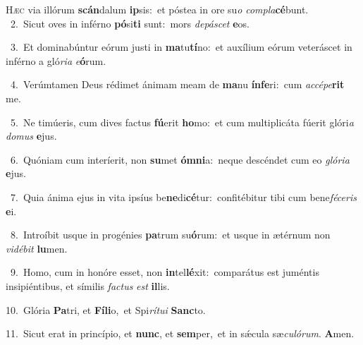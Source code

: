 \lettrine{\initial\textcolor{\initialcolor}{H}}{æc} via illórum \textbf{scán}\-dalum \textbf{ip}\-sis:~\star et póstea in ore su\textit{o} \textit{com}\-\textit{pla}\textbf{cé}bunt.\\
{\numbfont\textcolor{\numbcolor}{~2.}}~Sicut oves in inférno \textbf{pó}\-si\textbf{ti} sunt:~\star mors \textit{de}\-\textit{pá}\textit{scet} \textbf{e}\-os.\par
{\numbfont\textcolor{\numbcolor}{~3.}}~Et dominabúntur eórum justi in \textbf{ma}\-tu\-\textbf{tí}\-no:~\star et auxílium eórum veteráscet in inférno a gló\-\textit{ri}\-\textit{a} \textit{e}\-\textbf{ó}rum.\par
{\numbfont\textcolor{\numbcolor}{~4.}}~Verúmtamen Deus rédimet ánimam meam de \textbf{ma}\-nu \textbf{ín}\-\textbf{fe}ri:~\star cum \textit{ac}\-\textit{cé}\textit{pe}\textbf{rit} me.\par
{\numbfont\textcolor{\numbcolor}{~5.}}~Ne timúeris, cum dives factus \textbf{fú}\-erit \textbf{ho}\-mo:~\star et cum multiplicáta fúerit glóri\textit{a} \textit{do}\-\textit{mus} \textbf{e}\-jus.\par
{\numbfont\textcolor{\numbcolor}{~6.}}~Quóniam cum interíerit, non \textbf{su}\-met \textbf{óm}\-\textbf{ni}a:~\star neque descéndet cum eo \textit{gló}\-\textit{ri}\textit{a} \textbf{e}\-jus.\par
{\numbfont\textcolor{\numbcolor}{~7.}}~Quia ánima ejus in vita ipsíus be\-\textbf{ne}\-di\-\textbf{cé}\-tur:~\star confitébitur tibi cum bene\-\textit{fé}\-\textit{ce}\textit{ris} \textbf{e}\-i.\par
{\numbfont\textcolor{\numbcolor}{~8.}}~Introíbit usque in progénies \textbf{pa}\-trum su\-\textbf{ó}\-rum:~\star et usque in ætérnum non \textit{vi}\-\textit{dé}\textit{bit} \textbf{lu}\-men.\par
{\numbfont\textcolor{\numbcolor}{~9.}}~Homo, cum in honóre esset, non \textbf{in}\-tel\-\textbf{lé}\-xit:~\star comparátus est juméntis insipiéntibus, et símilis \textit{fac}\-\textit{tus} \textit{est} \textbf{il}\-lis.\par
{\numbfont\textcolor{\numbcolor}{10.}}~Glória \textbf{Pa}\-tri, et \textbf{Fí}\-\textbf{li}o,~\star et Spi\-\textit{rí}\-\textit{tu}\textit{i} \textbf{Sanc}\-to.\par
{\numbfont\textcolor{\numbcolor}{11.}}~Sicut erat in princípio, et \textbf{nunc}\-, et \textbf{sem}\-per,~\star et in sǽcula sæ\-\textit{cu}\-\textit{ló}\textit{rum}. \textbf{A}\-men.\par
